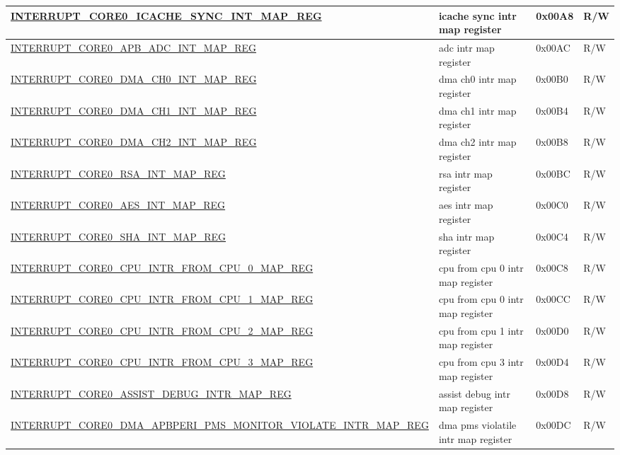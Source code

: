 \begin{longtable}{ | p{6cm} | p{7.2cm} | p{1.3cm} | p{1cm} | }
\hyperref[regdesc:INTERRUPTCORE0ICACHESYNCINTMAPREG]{INTERRUPT\_CORE0\_ICACHE\_SYNC\_INT\_MAP\_REG} & icache sync intr map register & 0x00A8 & R/W \\ \hline
\hyperref[regdesc:INTERRUPTCORE0APBADCINTMAPREG]{INTERRUPT\_CORE0\_APB\_ADC\_INT\_MAP\_REG} & adc intr map register & 0x00AC & R/W \\ \hline
\hyperref[regdesc:INTERRUPTCORE0DMACH0INTMAPREG]{INTERRUPT\_CORE0\_DMA\_CH0\_INT\_MAP\_REG} & dma ch0 intr map register & 0x00B0 & R/W \\ \hline
\hyperref[regdesc:INTERRUPTCORE0DMACH1INTMAPREG]{INTERRUPT\_CORE0\_DMA\_CH1\_INT\_MAP\_REG} & dma ch1 intr map register & 0x00B4 & R/W \\ \hline
\hyperref[regdesc:INTERRUPTCORE0DMACH2INTMAPREG]{INTERRUPT\_CORE0\_DMA\_CH2\_INT\_MAP\_REG} & dma ch2 intr map register & 0x00B8 & R/W \\ \hline
\hyperref[regdesc:INTERRUPTCORE0RSAINTMAPREG]{INTERRUPT\_CORE0\_RSA\_INT\_MAP\_REG} & rsa intr map register & 0x00BC & R/W \\ \hline
\hyperref[regdesc:INTERRUPTCORE0AESINTMAPREG]{INTERRUPT\_CORE0\_AES\_INT\_MAP\_REG} & aes intr map register & 0x00C0 & R/W \\ \hline
\hyperref[regdesc:INTERRUPTCORE0SHAINTMAPREG]{INTERRUPT\_CORE0\_SHA\_INT\_MAP\_REG} & sha intr map register & 0x00C4 & R/W \\ \hline
\hyperref[regdesc:INTERRUPTCORE0CPUINTRFROMCPU0MAPREG]{INTERRUPT\_CORE0\_CPU\_INTR\_FROM\_CPU\_0\_MAP\_REG} & cpu from cpu 0 intr map register & 0x00C8 & R/W \\ \hline
\hyperref[regdesc:INTERRUPTCORE0CPUINTRFROMCPU1MAPREG]{INTERRUPT\_CORE0\_CPU\_INTR\_FROM\_CPU\_1\_MAP\_REG} & cpu from cpu 0 intr map register & 0x00CC & R/W \\ \hline
\hyperref[regdesc:INTERRUPTCORE0CPUINTRFROMCPU2MAPREG]{INTERRUPT\_CORE0\_CPU\_INTR\_FROM\_CPU\_2\_MAP\_REG} & cpu from cpu 1 intr map register & 0x00D0 & R/W \\ \hline
\hyperref[regdesc:INTERRUPTCORE0CPUINTRFROMCPU3MAPREG]{INTERRUPT\_CORE0\_CPU\_INTR\_FROM\_CPU\_3\_MAP\_REG} & cpu from cpu 3 intr map register & 0x00D4 & R/W \\ \hline
\hyperref[regdesc:INTERRUPTCORE0ASSISTDEBUGINTRMAPREG]{INTERRUPT\_CORE0\_ASSIST\_DEBUG\_INTR\_MAP\_REG} & assist debug intr map register & 0x00D8 & R/W \\ \hline
\hyperref[regdesc:INTERRUPTCORE0DMAAPBPERIPMSMONITORVIOLATEINTRMAPREG]{INTERRUPT\_CORE0\_DMA\_APBPERI\_PMS\_MONITOR\_VIOLATE\_INTR\_MAP\_REG} & dma pms violatile intr map register & 0x00DC & R/W \\ \hline

\end{longtable}
